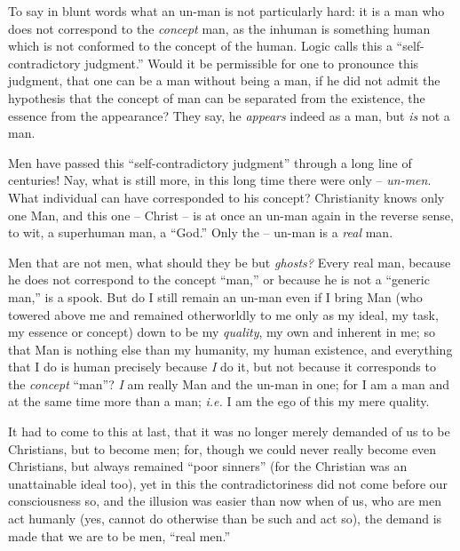 \documentclass[12pt,a4paper]{book}
\begin{document}
To say in blunt words what an un-man is not particularly hard: it is a man who 
does not correspond to the \textit{concept} man, as the inhuman is something 
human which is not conformed to the concept of the human. Logic calls this a 
``self-contradictory judgment.'' Would it be permissible for one to 
pronounce this judgment, that one can be a man without being a man, if he did 
not admit the hypothesis that the concept of man can be separated from the 
existence, the essence from the appearance? They say, he \textit{appears} 
indeed as a man, but \textit{is} not a man.

Men have passed this ``self-contradictory judgment'' through a long line of 
centuries! Nay, what is still more, in this long time there were only -- 
\textit{un-men}. What individual can have corresponded to his concept? 
Christianity knows only one Man, and this one -- Christ -- is at once an 
un-man again in the reverse sense, to wit, a superhuman man, a ``God.'' Only 
the -- un-man is a \textit{real} man.

Men that are not men, what should they be but \textit{ghosts?} Every real man, 
because he does not correspond to the concept ``man,'' or because he is not 
a ``generic man,'' is a spook. But do I still remain an un-man even if I 
bring Man (who towered above me and remained otherworldly to me only as my 
ideal, my task, my essence or concept) down to be my \textit{quality}, my own 
and inherent in me; so that Man is nothing else than my humanity, my human 
existence, and everything that I do is human precisely because \textit{I} do 
it, but not because it corresponds to the \textit{concept} ``man''? 
\textit{I} am really Man and the un-man in one; for I am a man and at the same 
time more than a man; \textit{i.e.} I am the ego of this my mere quality.

It had to come to this at last, that it was no longer merely demanded of us to 
be Christians, but to become men; for, though we could never really become 
even Christians, but always remained ``poor sinners'' (for the Christian was 
an unattainable ideal too), yet in this the contradictoriness did not come 
before our consciousness so, and the illusion was easier than now when of us, 
who are men act humanly (yes, cannot do otherwise than be such and act so), 
the demand is made that we are to be men, ``real men.''
\end{document}
